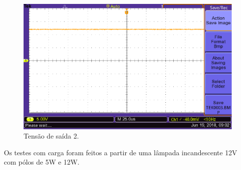 \begin{figure}[!htb]
	\centering
	\includegraphics[width=14cm]{figuras/tensaoDois.png}
	\caption{Tensão de saída 2.}
	\label{tensaoDois}
\end{figure}

Os testes com carga foram feitos a partir de uma lâmpada incandescente 12V com pólos de 5W e 12W.

